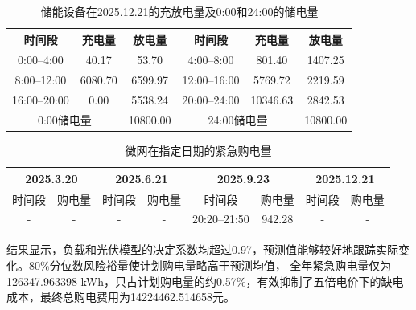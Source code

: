 \documentclass[UTF8]{ctexart}
\begin{document}
    \begin{table}[htbp]
        \centering
        \caption{储能设备在2025.12.21的充放电量及0:00和24:00的储电量}
        \label{tab:q2_battery_1221}
        \begin{tabular}{cccccc}
            \toprule
            时间段 & 充电量 & 放电量 & 时间段 & 充电量 & 放电量 \\
            \midrule
            0:00--4:00   & 40.17 & 53.70 &
            4:00--8:00   & 801.40 & 1407.25 \\
            8:00--12:00  & 6080.70 & 6599.97 &
            12:00--16:00 & 5769.72 & 2219.59 \\
            16:00--20:00 & 0.00 & 5538.24 &
            20:00--24:00 & 10346.63 & 2842.53 \\
            \midrule
            \multicolumn{2}{c}{0:00储电量} & 10800.00 &
            \multicolumn{2}{c}{24:00储电量} & 10800.00 \\
            \bottomrule
        \end{tabular}
    \end{table}
    
    
    \begin{table}[htbp]
        \centering
        \caption{微网在指定日期的紧急购电量}
        \label{tab:q2_emergency}
        
        \begin{tabular}{cccccccc}
            \toprule
            \multicolumn{2}{c}{2025.3.20} &
            \multicolumn{2}{c}{2025.6.21} &
            \multicolumn{2}{c}{2025.9.23} &
            \multicolumn{2}{c}{2025.12.21} \\
            
            \midrule
            时间段 & 购电量 &
            时间段 & 购电量 &
            时间段 & 购电量 &
            时间段 & 购电量 \\
            
            \midrule
            - & - &
            - & - &
            20:20--21:50 & 942.28 &
            - & - \\
            
            \bottomrule
        \end{tabular}
    \end{table}
    结果显示，负载和光伏模型的决定系数均超过0.97，预测值能够较好地跟踪实际变化。80\%分位数风险裕量使计划购电量略高于预测均值，
    全年紧急购电量仅为126347.963398 kWh，只占计划购电量的约0.57\%，有效抑制了五倍电价下的缺电成本，最终总购电费用为14224462.514658元。\par
    
\end{document}

